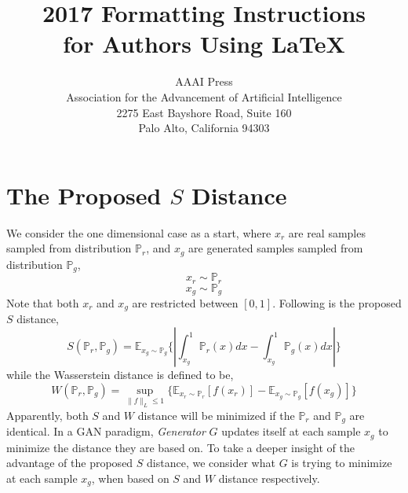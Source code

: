 \documentclass[letterpaper]{article} %
\begin{document}
%
\title{2017 Formatting Instructions \\for Authors Using \LaTeX{}}
\author{AAAI Press\\
Association for the Advancement of Artificial Intelligence\\
2275 East Bayshore Road, Suite 160\\
Palo Alto, California 94303\\
}
\maketitle
\begin{abstract}
\end{abstract}

\section{The Proposed $S$ Distance}
We consider the one dimensional case as a start, where $x_{r}$ are real samples sampled from distribution $\mathbb{P}_{r}$, and $x_{g}$ are generated samples sampled from distribution $\mathbb{P}_{g}$,
\begin{equation}\label{x-r}
   x_{r} \sim \mathbb{P}_{r}
\end{equation}
\begin{equation}\label{x-g}
  x_{g} \sim \mathbb{P}_{g}
\end{equation}
Note that both $x_{r}$ and $x_{g}$ are restricted between $[0,1]$. Following is the proposed $S$ distance,
\begin{equation}\label{s-distance}
  S(\mathbb{P}_r,\mathbb{P}_g)=\mathbb{E}_{x_g \sim \mathbb{P}_g} \{ | \int_{x_g}^{1} \mathbb{P}_r(x) d x - \int_{x_g}^{1} \mathbb{P}_g(x) d x | \}
\end{equation}
while the Wasserstein distance is defined to be,
\begin{equation}\label{w-distance}
  W(\mathbb{P}_r,\mathbb{P}_g)=\sup_{\|f\|_L \leq 1} \{ \mathbb{E}_{x_r \sim \mathbb{P}_r} [f(x_r)] - \mathbb{E}_{x_g \sim \mathbb{P}_g} [f(x_g)] \}
\end{equation}
Apparently, both $S$ and $W$ distance will be minimized if the $\mathbb{P}_r$ and $\mathbb{P}_g$ are identical.
In a GAN paradigm, \textit{Generator} $G$ updates itself at each sample $x_g$ to minimize the distance they are based on.
To take a deeper insight of the advantage of the proposed $S$ distance, we consider what $G$ is trying to minimize at each sample $x_g$, when based on $S$ and $W$ distance respectively.
\end{document}
